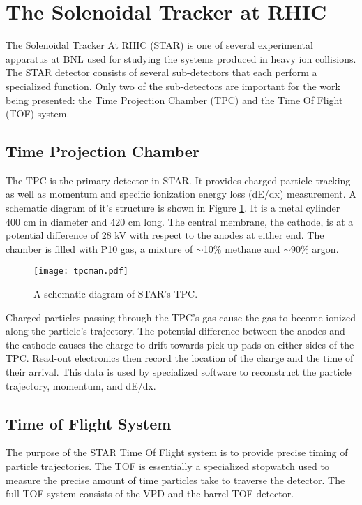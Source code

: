 \section{The Solenoidal Tracker at RHIC}
\label{sec:star}
The Solenoidal Tracker At RHIC (STAR) is one of several experimental apparatus at BNL used for studying the systems produced in heavy ion collisions. The STAR detector consists of several sub-detectors that each perform a specialized function. Only two of the sub-detectors are important for the work being presented: the Time Projection Chamber (TPC) and the Time Of Flight (TOF) system. 

\subsection{ Time Projection Chamber }
The TPC is the primary detector in STAR. It provides charged particle tracking as well as momentum and specific ionization energy loss (dE/dx) measurement. A schematic diagram of it's structure is shown in Figure \ref{fig:tpcman}. It is a metal cylinder 400 cm in diameter and 420 cm long. The central membrane, the cathode, is at a potential difference of 28 kV with respect to the anodes at either end. The chamber is filled with P10 gas, a mixture of $\sim$10\% methane and $\sim$90\% argon\cite{anderson_star_2003}. 

	\begin{figure}
		\centering 
		\texttt{[image: tpcman.pdf]} 
		 
		\caption{ \label{fig:tpcman} A schematic diagram of STAR's TPC\cite{anderson_star_2003}. } 
	\end{figure}

Charged particles passing through the TPC's gas cause the gas to become ionized along the particle's trajectory. The potential difference between the anodes and the cathode causes the charge to drift towards pick-up pads on either sides of the TPC. Read-out electronics then record the location of the charge and the time of their arrival. This data is used by specialized software to reconstruct the particle trajectory, momentum, and dE/dx.


\subsection{ Time of Flight System }
The purpose of the STAR Time Of Flight system is to provide precise timing of particle trajectories. The TOF is essentially a specialized stopwatch used to measure the precise amount of time particles take to traverse the detector. The full TOF system consists of the VPD and the barrel TOF detector.

